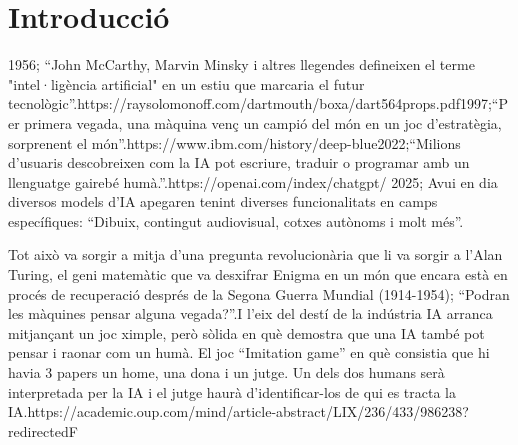 \chapter{Introducció}
\label{c:intro}
1956; ``John McCarthy, Marvin Minsky i altres llegendes defineixen el terme "intel·ligència artificial" en un estiu que marcaria el futur tecnològic''.{https://raysolomonoff.com/dartmouth/boxa/dart564props.pdf}1997;``Per primera vegada, una màquina venç un campió del món en un joc d'estratègia, sorprenent el món''.{https://www.ibm.com/history/deep-blue}2022;``Milions d'usuaris descobreixen com la IA pot escriure, traduir o programar amb un llenguatge gairebé humà.''.{https://openai.com/index/chatgpt/} 2025;  Avui en dia diversos models d'IA apegaren tenint diverses funcionalitats en camps específiques: ``Dibuix, contingut audiovisual, cotxes autònoms i molt més''.

Tot això va sorgir a mitja d'una pregunta revolucionària que li va sorgir a l'Alan Turing, el geni matemàtic que va desxifrar Enigma en un món que encara està en procés de recuperació després de la Segona Guerra Mundial (1914-1954); ``Podran les màquines pensar alguna vegada?''.I l'eix del destí de la indústria IA arranca mitjançant un joc ximple, però sòlida en què demostra que una IA també pot pensar i raonar com un humà. El joc ``Imitation game'' en què consistia que hi havia 3 papers un home, una dona i un jutge. Un dels dos humans serà interpretada per la IA i el jutge haurà d'identificar-los de qui es tracta la IA.{https://academic.oup.com/mind/article-abstract/LIX/236/433/986238?redirectedF}
